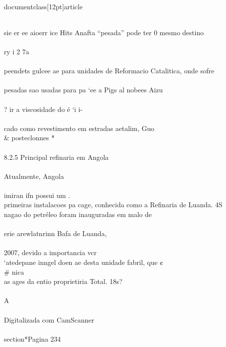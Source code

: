 \\documentclass[12pt]{article}
\begin{document}
\\
sie er ee aioerr ice Hits Anafta “pesada” pode ter 0 mesmo destino\\
\\
ry i 2 7a\\
\\
peendets gulcee ae para unidades de Reformacio Catalitica, onde sofre\\
\\
pesadas sao usadas para pa ‘ee a Pigs al nobees Aizu\\
\\
? ir a viscosidade do é ‘i i-\\
\\
cado como revestimento em estradas aetalim, Guo \\& posteclonnes *\\
\\
8.2.5 Principal refinaria em Angola\\
\\
Atualmente, Angola\\
\\
imiran ifn possui um .\\
primeiras instalacoes pa cage, conhecida como a Refinaria de Luanda. 4S\\
nagao do petréleo foram inauguradas em malo de\\
\\
erie arewlatnrinn Bafa de Luanda,\\
\\
2007, devido a importancia vcr\\
‘atedepane inngel doen ae desta unidade fabril, que ¢\\# nica\\
as ages da entio proprietiria Total. 18s?\\
\\
A\\
\\
Digitalizada com CamScanner\\

\\section*{Pagina 234}
\end{document}

